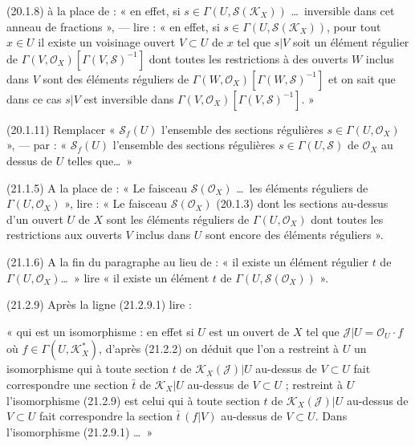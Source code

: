 \documentclass[11pt,a4paper]{article}
\begin{document}
(20.1.8) à la place de : « en effet, si $s \in \Gamma(U, \mathcal{S}(\mathcal{K}_X))$
\ldots\ inversible dans cet anneau de fractions », --- lire :
« en effet, si $s \in \Gamma(U, \mathcal{S}(\mathcal{K}_X))$, pour tout
$x \in U$ il existe un voisinage ouvert $V \subset U$ de $x$ tel que $s|V$ soit
un élément régulier de $\Gamma(V, \mathcal{O}_X)[\Gamma(V, \mathcal{S})^{-1}]$
dont toutes les restrictions à des ouverts $W$ inclus dans $V$ sont des
éléments réguliers de $\Gamma(W, \mathcal{O}_X)[\Gamma(W, \mathcal{S})^{-1}]$
et on sait que dans ce cas $s|V$ est inversible dans
$\Gamma(V, \mathcal{O}_X)[\Gamma(V, \mathcal{S})^{-1}]$. »

(20.1.11) Remplacer « $\mathcal{S}_f(U)$ l'ensemble des sections régulières
$s \in \Gamma(U, \mathcal{O}_X)$  », --- par :
« $\mathcal{S}_f(U)$ l'ensemble des sections régulières
$s \in \Gamma(U, \mathcal{S})$  de $\mathcal{O}_X$ au
dessus de $U$ telles que\ldots\ »


(21.1.5) A la place de : « Le faisceau $\mathcal{S}(\mathcal{O}_X)$ \ldots\
les éléments réguliers de $\Gamma(U, \mathcal{O}_X)$ », lire : « Le faisceau
$\mathcal{S}(\mathcal{O}_X)$ (20.1.3) dont les sections au-dessus d'un ouvert
$U$ de $X$ sont les éléments réguliers de $\Gamma(U, \mathcal{O}_X)$ dont
toutes les restrictions aux ouverts $V$ inclus dans $U$ sont encore des
éléments réguliers ».

(21.1.6) A la fin du paragraphe au lieu de : « il existe un élément régulier
$t$ de $\Gamma(U, \mathcal{O}_X)$\ldots\ » lire « il existe un élément
\struck{régulier} $t$ de $\Gamma(U, \mathcal{S}(\mathcal{O}_X))$ ».

(21.2.9) Après la ligne (21.2.9.1) lire :

« qui est un isomorphisme : en effet si $U$ est un ouvert de $X$ tel que
$\mathcal{J}|U = \mathcal{O}_U \cdot f$ où $f \in \Gamma(U, \mathcal{K}_X^*)$,
d'après (21.2.2) on déduit que l'on a \struck{un isomorphisme} restreint à $U$
un isomorphisme \struck{de} qui à toute section $t$ de
$\mathcal{K}_X(\mathcal{J})|U$ au-dessus de $V \subset U$ fait correspondre une
section $\bar{t}$ de $\mathcal{K}_X|U$ au-dessus de $V \subset U$ ; restreint à
$U$ l'isomorphisme (21.2.9) est celui qui à toute section $t$ de
$\mathcal{K}_X(\mathcal{J})|U$ au-dessus de $V \subset U$ fait correspondre la
section $\bar{t}\,(f|V)$ au-dessus de $V \subset U$. Dans l'isomorphisme
(21.2.9.1) \ldots\ »
\end{document}
